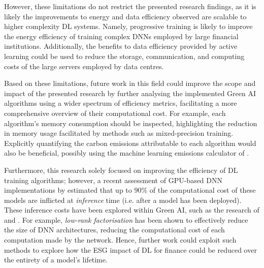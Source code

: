 \documentclass[a4paper, 11pt]{report}
\begin{document}
    However, these limitations do not restrict the presented research findings, as it is likely the improvements to energy and data efficiency observed are scalable to higher complexity DL systems. Namely, progressive training is likely to improve the energy efficiency of training complex DNNs employed by large financial institutions. Additionally, the benefits to data efficiency provided by active learning could be used to reduce the storage, communication, and computing costs of the large servers employed by data centres.

    Based on these limitations, future work in this field could improve the scope and impact of the presented research by further analysing the implemented Green AI algorithms using a wider spectrum of efficiency metrics, facilitating a more comprehensive overview of their computational cost. For example, each algorithm's memory consumption should be inspected, highlighting the reduction in memory usage facilitated by methods such as mixed-precision training. Explicitly quantifying the carbon emissions attributable to each algorithm would also be beneficial, possibly using the machine learning emissions calculator of \citet{lacoste-2019}.

    Furthermore, this research solely focused on improving the efficiency of DL training algorithms; however, a recent assessment of GPU-based DNN implementations by \citet{jain-2019} estimated that up to $90\%$ of the computational cost of these models are inflicted at \emph{inference} time (i.e. after a model has been deployed). These inference costs have been explored within Green AI, such as the research of \citet{lacoste-2019} and \citet{cai-2022}. For example, \emph{low-rank factorisation} \citep{xu-2021} has been shown to effectively reduce the size of DNN architectures, reducing the computational cost of each computation made by the network. Hence, further work could exploit such methods to explore how the ESG impact of DL for finance could be reduced over the entirety of a model's lifetime.


    \newpage
    \footnotesize
    
\end{document}

